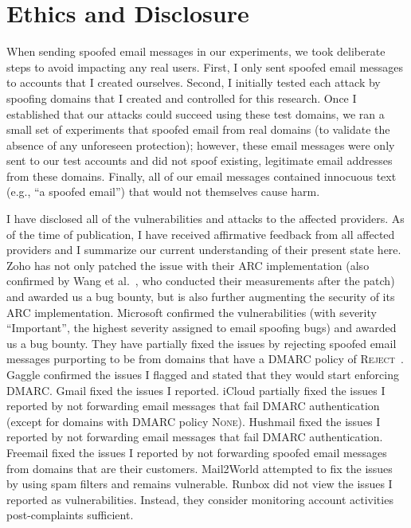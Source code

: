 \section{Ethics and Disclosure}
\label{sec:disclosure}
When sending spoofed email messages in our experiments,
we took deliberate steps to avoid impacting any real users.
First, I only sent spoofed email messages to accounts that I created ourselves.
Second, I initially tested each attack by spoofing domains that I created and controlled for this research.
Once I established that our attacks could succeed using these test domains,
we ran a small set of experiments that spoofed email from real domains (to validate the absence of any unforeseen protection);
however, these email messages were only sent to our test accounts and did not spoof existing, legitimate email addresses from these domains.
Finally, all of our email messages contained innocuous text (e.g., ``a spoofed email'') that would not themselves cause harm.

I have disclosed all of the vulnerabilities and attacks to the
affected providers. As of the time of publication, I have received
affirmative feedback from all affected providers and I summarize our
current understanding of their present state here. Zoho has not only
patched the issue with their ARC implementation (also confirmed by
Wang et al.~\cite{wang2022revisiting}, who conducted their
measurements after the patch) and awarded us a bug bounty, but is also
further augmenting the security of its ARC implementation. Microsoft
confirmed the vulnerabilities (with severity ``Important'', the
highest severity assigned to email spoofing bugs) and awarded us a bug
bounty. They have partially fixed the issues by rejecting spoofed email
messages purporting to be from domains that have a DMARC policy of
\textsc{Reject}~\cite{hotmailreject}.
Gaggle confirmed the issues I flagged and stated that they would
start enforcing DMARC. Gmail fixed the issues I reported.  iCloud
partially fixed the issues I reported by not forwarding email
messages that fail DMARC authentication (except for domains with DMARC
policy \textsc{None}). Hushmail fixed the issues I reported by not
forwarding email messages that fail DMARC authentication. Freemail
fixed the issues I reported by not forwarding spoofed email messages
from domains that are their customers. Mail2World attempted to fix the
issues by using spam filters and remains vulnerable. Runbox did not
view the issues I reported as vulnerabilities. Instead, they consider
monitoring account activities post-complaints sufficient.
